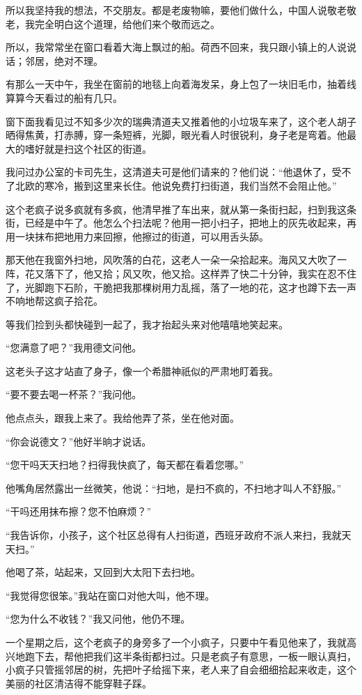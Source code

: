 \par 所以我坚持我的想法，不交朋友。都是老废物嘛，要他们做什么，中国人说敬老敬老，我完全明白这个道理，给他们来个敬而远之。
\par 所以，我常常坐在窗口看着大海上飘过的船。荷西不回来，我只跟小镇上的人说说话；邻居，绝对不理。
\par 有那么一天中午，我坐在窗前的地毯上向着海发呆，身上包了一块旧毛巾，抽着线算算今天看过的船有几只。
\par 窗下面我看见过不知多少次的瑞典清道夫又推着他的小垃圾车来了，这个老人胡子晒得焦黄，打赤膊，穿一条短裤，光脚，眼光看人时很锐利，身子老是弯着。他最大的嗜好就是扫这个社区的街道。
\par 我问过办公室的卡司先生，这清道夫可是他们请来的？他们说：“他退休了，受不了北欧的寒冷，搬到这里来长住。他说免费打扫街道，我们当然不会阻止他。”
\par 这个老疯子说多疯就有多疯，他清早推了车出来，就从第一条街扫起，扫到我这条街，已经是中午了。他怎么个扫法呢？他用一把小扫子，把地上的灰先收起来，再用一块抹布把地用力来回擦，他擦过的街道，可以用舌头舔。
\par 那天他在我窗外扫地，风吹落的白花，这老人一朵一朵拾起来。海风又大吹了一阵，花又落下了，他又拾；风又吹，他又拾。这样弄了快二十分钟，我实在忍不住了，光脚跑下石阶，干脆把我那棵树用力乱摇，落了一地的花，这才也蹲下去一声不响地帮这疯子拾花。
\par 等我们捡到头都快碰到一起了，我才抬起头来对他嘻嘻地笑起来。
\par “您满意了吧？”我用德文问他。
\par 这老头子这才站直了身子，像一个希腊神祇似的严肃地盯着我。
\par “要不要去喝一杯茶？”我问他。
\par 他点点头，跟我上来了。我给他弄了茶，坐在他对面。
\par “你会说德文？”他好半晌才说话。
\par “您干吗天天扫地？扫得我快疯了，每天都在看着您哪。”
\par 他嘴角居然露出一丝微笑，他说：“扫地，是扫不疯的，不扫地才叫人不舒服。”
\par “干吗还用抹布擦？您不怕麻烦？”
\par “我告诉你，小孩子，这个社区总得有人扫街道，西班牙政府不派人来扫，我就天天扫。”
\par 他喝了茶，站起来，又回到大太阳下去扫地。
\par “我觉得您很笨。”我站在窗口对他大叫，他不理。
\par “您为什么不收钱？”我又问他，他仍不理。
\par 一个星期之后，这个老疯子的身旁多了一个小疯子，只要中午看见他来了，我就高兴地跑下去，帮他把我们这半条街都扫过。只是老疯子有意思，一板一眼认真扫，小疯子只管摇邻居的树，先把叶子给摇下来，老人来了自会细细拾起来收走，这个美丽的社区清洁得不能穿鞋子踩。
